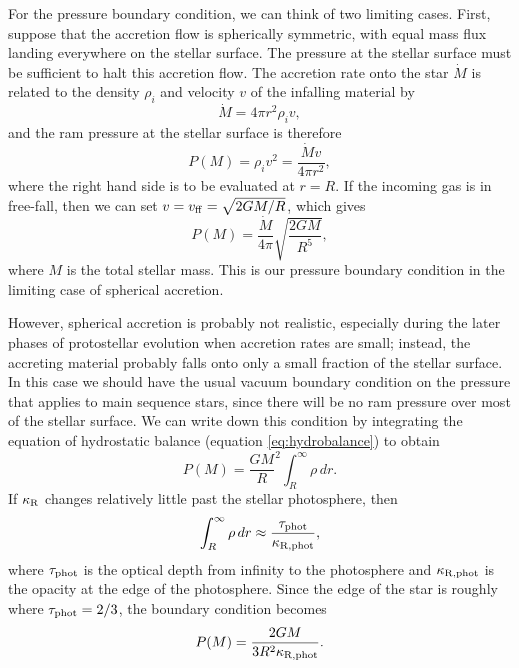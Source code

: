 For the pressure boundary condition, we can think of two limiting cases. First, suppose that the accretion flow is spherically symmetric, with equal mass flux landing everywhere on the stellar surface. The pressure at the stellar surface must be sufficient to halt this accretion flow. The accretion rate onto the star $\dot{M}$ is related to the density $\rho_i$ and velocity $v$ of the infalling material by
\begin{equation}
\dot{M} = 4\pi r^2 \rho_i v,
\end{equation}
and the ram pressure at the stellar surface is therefore
\begin{equation}
P(M) = \rho_i v^2 = \frac{\dot{M} v}{4\pi r^2},
\end{equation}
where the right hand side is to be evaluated at $r=R$. If the incoming gas is in free-fall, then we can set $v = v_{\rm ff} = \sqrt{2GM/R}$, which gives
\begin{equation}
\label{pbound1}
P(M) = \frac{\dot{M}}{4\pi} \sqrt{\frac{2 G M}{R^5}},
\end{equation}
where $M$ is the total stellar mass. This is our pressure boundary condition in the limiting case of spherical accretion.

However, spherical accretion is probably not realistic, especially during the later phases of protostellar evolution when accretion rates are small; instead, the accreting material probably falls onto only a small fraction of the stellar surface. In this case we should have the usual vacuum boundary condition on the pressure that applies to main sequence stars, since there will be no ram pressure over most of the stellar surface. We can write down this condition by integrating the equation of hydrostatic balance (equation \ref{eq:hydrobalance}) to obtain 
\begin{equation}
P(M) = \frac{G M}{R}^2 \int_{R}^{\infty} \rho \, dr.
\end{equation}
If $\kappa_{\rm R}$ changes relatively little past the stellar photosphere, then 
\begin{equation}
\int _{R}^{\infty} \rho \, dr \approx \frac{\tau_{\rm phot}}{\kappa_{\rm R, phot}},
\end{equation}
where $\tau_{\rm phot}$ is the optical depth from infinity to the photosphere and $\kappa_{\rm R, phot}$ is the opacity at the edge of the photosphere. Since the edge of the star is roughly where $\tau_{\rm phot} = 2/3$, the boundary condition becomes
\begin{equation}
\label{pbound2}
P(M) = \frac{2 G M}{3 R^2 \kappa_{\rm R, phot}}.
\end{equation}

